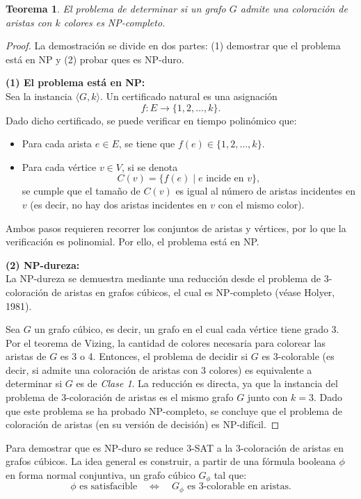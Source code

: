 \documentclass[a4paper]{article}
\newtheorem{theorem}{Teorema}
\begin{document}
\begin{theorem}
El problema de determinar si un grafo $G$ admite una coloración de aristas con $k$ colores es NP-completo.
\end{theorem}

\begin{proof}
La demostración se divide en dos partes: (1) demostrar que el problema está en NP y (2) probar ques es NP-duro.

\textbf{(1) El problema está en NP:}\\
Sea la instancia $\langle G,k \rangle$. Un certificado natural es una asignación 
\[
f : E \to \{1,2,\dots,k\}.
\]
Dado dicho certificado, se puede verificar en tiempo polinómico que:
\begin{itemize}
    \item Para cada arista $e\in E$, se tiene que $f(e)\in \{1,2,\dots,k\}$.
    \item Para cada vértice $v\in V$, si se denota
    \[
    C(v)=\{ f(e) \mid e \text{ incide en } v \},
    \]
    se cumple que el tamaño de $C(v)$ es igual al número de aristas incidentes en $v$ (es decir, no hay dos aristas incidentes en $v$ con el mismo color).
\end{itemize}
Ambos pasos requieren recorrer los conjuntos de aristas y vértices, por lo que la verificación es polinomial. Por ello, el problema está en NP.

\vspace{0.3cm}
\textbf{(2) NP-dureza:}\\
La NP-dureza se demuestra mediante una reducción desde el problema de 3-coloración de aristas en grafos cúbicos, el cual es NP-completo (véase Holyer, 1981).

Sea $G$ un grafo cúbico, es decir, un grafo en el cual cada vértice tiene grado 3. Por el teorema de Vizing, la cantidad de colores necesaria para colorear las aristas de $G$ es 3 o 4. Entonces, el problema de decidir si $G$ es 3-colorable (es decir, si admite una coloración de aristas con 3 colores) es equivalente a determinar si $G$ es de \emph{Clase 1}. La reducción es directa, ya que la instancia del problema de 3-coloración de aristas es el mismo grafo $G$ junto con $k=3$. Dado que este problema se ha probado NP-completo, se concluye que el problema de coloración de aristas (en su versión de decisión) es NP-difícil.

\end{proof}

Para demostrar que es NP-duro se reduce 3-SAT a la 3-coloración de aristas en grafos cúbicos. La idea general es construir, a partir de una fórmula booleana $\phi$ en forma normal conjuntiva, un grafo cúbico $G_\phi$ tal que:
\[
\phi \text{ es satisfacible} \quad\Longleftrightarrow\quad G_\phi \text{ es 3-colorable en aristas.}
\]
\end{document}
